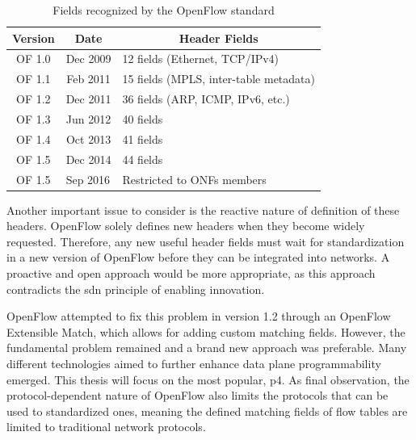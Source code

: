\begin{table}[]
	\centering
    \begin{tabular}{|c|c|l|}
    \hline
    \rowcolor[HTML]{EFEFEF} 
    \textbf{Version} & \textbf{Date}                 & \multicolumn{1}{c|}{\cellcolor[HTML]{EFEFEF}\textbf{Header Fields}} \\ \hline
    OF 1.0 & Dec 2009 & 12 fields (Ethernet, TCP/IPv4)         \\ \hline
    OF 1.1 & Feb 2011 & 15 fields (MPLS, inter-table metadata) \\ \hline
    OF 1.2 & Dec 2011 & 36 fields (ARP, ICMP, IPv6, etc.)      \\ \hline
    OF 1.3 & Jun 2012 & 40 fields                              \\ \hline
    OF 1.4 & Oct 2013 & 41 fields                              \\ \hline
    OF 1.5 & Dec 2014 & 44 fields                              \\ \hline
    OF 1.5           & \multicolumn{1}{l|}{Sep 2016} & Restricted to ONFs members                                          \\ \hline
    \end{tabular}
    \caption{Fields recognized by the OpenFlow standard\cite{bosshart_p4_2014}}
    \label{tb:openflow_version_fields}
\end{table}

Another important issue to consider is the reactive nature of definition of these headers. OpenFlow solely defines new headers when they become widely requested. Therefore, any new useful header fields must wait for standardization in a new version of OpenFlow before they can be integrated into networks. A proactive and open approach would be more appropriate, as this approach contradicts the \gls{sdn} principle of enabling innovation\cite{li_protocol_2017}. 

OpenFlow attempted to fix this problem in version 1.2 through an OpenFlow Extensible Match, which allows for adding custom matching fields\cite{kreutz_software-defined_2015}. However, the fundamental problem remained and a brand new approach was preferable. Many different technologies aimed to further enhance data plane programmability emerged. This thesis will focus on the most popular, \gls{p4}.
As final observation, the protocol-dependent nature of OpenFlow also limits the protocols that can be used to standardized ones, meaning the defined matching fields of flow tables are limited to traditional network protocols. 

